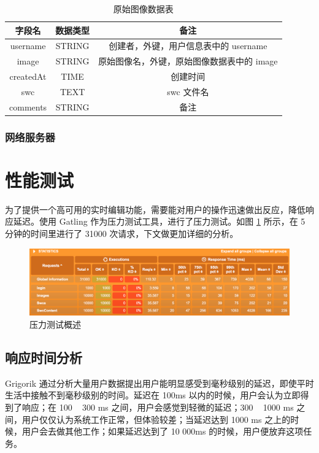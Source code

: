 \begin{table}
\centering
\caption{原始图像数据表}
\begin{tabular}{|c|c|c|}
			   \hline
                 字段名 & 数据类型 & 备注 \\
               \hline
                 username & STRING & 创建者，外键，用户信息表中的 username \\
               \hline
                 image & STRING & 原始图像名，外键，原始图像数据表中的 image \\
               \hline
                 createdAt & TIME & 创建时间 \\
               \hline
                 swc & TEXT & swc 文件名 \\
               \hline
                 comments & STRING & 备注 \\
               \hline
             \end{tabular}
             \label{swc-table}    
\end{table}

\subsubsection{网络服务器}


\section{性能测试}
为了提供一个高可用的实时编辑功能，需要能对用户的操作迅速做出反应，降低响应延迟。使用 Gatling 作为压力测试工具，进行了压力测试。如图 \ref{overview} 所示，在 5 分钟的时间里进行了 31000 次请求，下文做更加详细的分析。
\begin{figure}
\centering
\includegraphics[width=148mm]{images/overview}
\caption{压力测试概述}
\label{overview}
\end{figure}

\subsection{响应时间分析}

Grigorik 通过分析大量用户数据提出用户能明显感受到毫秒级别的延迟，即使平时生活中接触不到毫秒级别的时间。延迟在 100ms 以内的时候，用户会认为立即得到了响应；在 100 ~ 300 ms 之间，用户会感觉到轻微的延迟；300 ~ 1000 ms 之间，用户仅仅认为系统工作正常，但体验较差；当延迟达到 1000 ms 之上的时候，用户会去做其他工作；如果延迟达到了 10 000ms 的时候，用户便放弃这项任务。 

